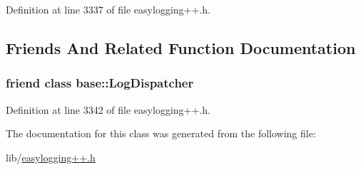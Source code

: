 Definition at line 3337 of file easylogging++.\+h.



\subsection{Friends And Related Function Documentation}
\hypertarget{classel_1_1_log_dispatch_data_a84d22f9ad5b796e49ff5f15a8c32773d}{}
\subsubsection[{base\+::\+Log\+Dispatcher}]{\setlength{\rightskip}{0pt plus 5cm}friend class {\bf base\+::\+Log\+Dispatcher}\hspace{0.3cm}{\ttfamily [friend]}}\label{classel_1_1_log_dispatch_data_a84d22f9ad5b796e49ff5f15a8c32773d}


Definition at line 3342 of file easylogging++.\+h.



The documentation for this class was generated from the following file\+:\begin{DoxyCompactItemize}
\item 
lib/\hyperlink{easylogging_09_09_8h}{easylogging++.\+h}\end{DoxyCompactItemize}
